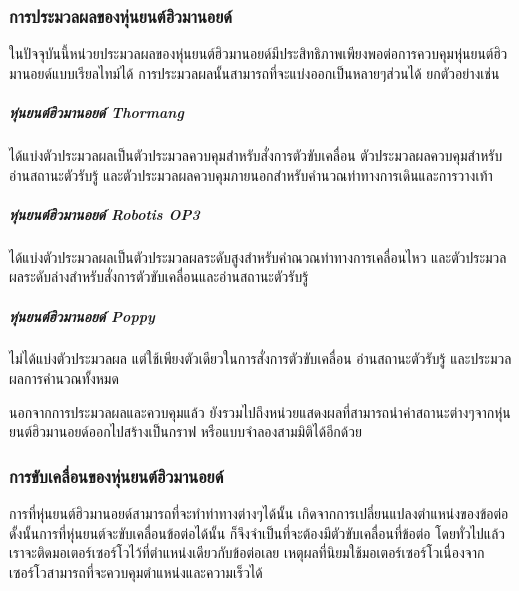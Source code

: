 \subsubsection*{การประมวลผลของหุ่นยนต์ฮิวมานอยด์}
ในปัจจุบันนี้หน่วยประมวลผลของหุ่นยนต์ฮิวมานอยด์มีประสิทธิภาพเพียงพอต่อการควบคุมหุ่นยนต์ฮิวมานอยด์แบบเรียลไทม์ได้
การประมวลผลนั้นสามารถที่จะแบ่งออกเป็นหลายๆส่วนได้ ยกตัวอย่างเช่น

\subparagraph*{หุ่นยนต์ฮิวมานอยด์ Thormang}
ได้แบ่งตัวประมวลผลเป็นตัวประมวลควบคุมสำหรับสั่งการตัวขับเคลื่อน ตัวประมวลผลควบคุมสำหรับอ่านสถานะตัวรับรู้ และตัวประมวลผลควบคุมภายนอกสำหรับคำนวณท่าทางการเดินและการวางเท้า
\subparagraph*{หุ่นยนต์ฮิวมานอยด์ Robotis OP3}
ได้แบ่งตัวประมวลผลเป็นตัวประมวลผลระดับสูงสำหรับคำณวณท่าทางการเคลื่อนไหว และตัวประมวลผลระดับล่างสำหรับสั่งการตัวขับเคลื่อนและอ่านสถานะตัวรับรู้
\subparagraph*{หุ่นยนต์ฮิวมานอยด์ Poppy}
ไม่ได้แบ่งตัวประมวลผล แต่ใช้เพียงตัวเดียวในการสั่งการตัวขับเคลื่อน อ่านสถานะตัวรับรู้ และประมวลผลการคำนวณทั้งหมด

นอกจากการประมวลผลและควบคุมแล้ว ยังรวมไปถึงหน่วยแสดงผลที่สามารถนำค่าสถานะต่างๆจากหุ่นยนต์ฮิวมานอยด์ออกไปสร้างเป็นกราฟ หรือแบบจำลองสามมิติได้อีกด้วย

\subsubsection*{การขับเคลื่อนของหุ่นยนต์ฮิวมานอยด์}
การที่หุ่นยนต์ฮิวมานอยด์สามารถที่จะทำท่าทางต่างๆได้นั้น เกิดจากการเปลี่ยนแปลงตำแหน่งของข้อต่อ ดั้งนั้นการที่หุ่นยนต์จะขับเคลื่อนข้อต่อได้นั้น
ก็จึงจำเป็นที่จะต้องมีตัวขับเคลื่อนที่ข้อต่อ โดยทั่วไปแล้วเราจะติดมอเตอร์เซอร์โวไว้ที่ตำแหน่งเดียวกับข้อต่อเลย เหตุผลที่นิยมใช้มอเตอร์เซอร์โวเนื่องจาก
เซอร์โวสามารถที่จะควบคุมตำแหน่งและความเร็วได้
